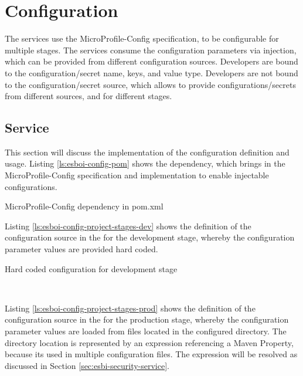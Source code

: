 \section{Configuration}
\label{sec:esbi-configuration}
The services use the MicroProfile-Config specification, to be configurable for multiple stages. The services consume the configuration parameters via injection, which can be provided from different configuration sources. Developers are bound to the configuration/secret name, keys, and value type. Developers are not bound to the configuration/secret source, which allows to provide configurations/secrets from different sources, and for different stages. 

\subsection{Service}
\label{sec:esbi-config-service}
This section will discuss the implementation of the configuration definition and usage. Listing \vref{ls:esboi-config-pom} shows the dependency, which brings in the MicroProfile-Config specification and implementation to enable injectable configurations.
 
\begin{listing}[h]
	\caption{MicroProfile-Config dependency in pom.xml}
	\label{ls:esboi-config-pom}
\end{listing}

Listing \vref{ls:esboi-config-project-stages-dev} shows the definition of the configuration source in the  for the development stage, whereby the configuration parameter values are provided hard coded.

\begin{listing}[h]
	\caption{Hard coded configuration for development stage}
	\label{ls:esboi-config-project-stages-dev}
\end{listing}
\ \newpage

Listing \vref{ls:esboi-config-project-stages-prod} shows the definition of the configuration source in the  for the production stage, whereby the configuration parameter values are loaded from files located in the configured directory. The directory location is represented by an expression referencing a Maven Property, because its used in multiple configuration files. The expression will be resolved as discussed in Section \vref{sec:esbi-security-service}.


